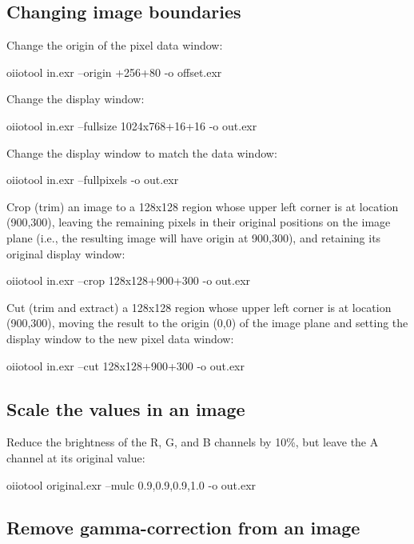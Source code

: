 \subsection*{Changing image boundaries}

\noindent Change the origin of the pixel data window:
\begin{code}
    oiiotool in.exr --origin +256+80 -o offset.exr
\end{code}

\noindent Change the display window:
\begin{code}
    oiiotool in.exr --fullsize 1024x768+16+16 -o out.exr
\end{code}

\noindent Change the display window to match the data window:
\begin{code}
    oiiotool in.exr --fullpixels -o out.exr
\end{code}

\noindent Crop (trim) an image to a 128x128 region whose upper left corner
is at location (900,300), leaving the remaining pixels in their original
positions on the image plane (i.e., the resulting image will have origin at
900,300), and retaining its original display window:
\begin{code}
    oiiotool in.exr --crop 128x128+900+300 -o out.exr
\end{code}

\noindent Cut (trim and extract) a 128x128 region whose upper left corner
is at location (900,300), moving the result to the origin (0,0) of the image
plane and setting the display window to the new pixel data window:
\begin{code}
    oiiotool in.exr --cut 128x128+900+300 -o out.exr
\end{code}


\subsection*{Scale the values in an image}

Reduce the brightness of the R, G, and B channels by 10\%,
but leave the A channel at its original value:

\begin{code}
    oiiotool original.exr --mulc 0.9,0.9,0.9,1.0 -o out.exr
\end{code}

\subsection*{Remove gamma-correction from an image}

